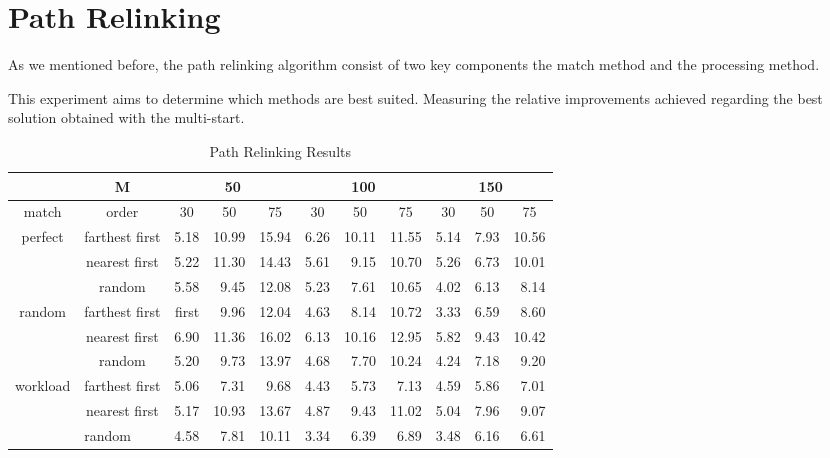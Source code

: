 \section{Path Relinking}
As we mentioned before,
the path relinking algorithm
consist of two key components
the match method and the processing method.

This experiment aims to determine which methods are best suited.
Measuring the relative improvements
achieved regarding the best solution
obtained with the multi-start.

\begin{table}[]
  \centering
  \label{tab:pr}
  \begin{tabular}{c|c|rrr|rrr|rrr|}
    \cline{2-11}
    \multicolumn{1}{l|}{} & M
    & \multicolumn{3}{c|}{50} 
    & \multicolumn{3}{c|}{100}
    & \multicolumn{3}{c|}{150}
    \\ \hline
    \multicolumn{1}{|c|}{match} & order
    & \multicolumn{1}{c}{30} & \multicolumn{1}{c}{50} & \multicolumn{1}{c|}{75}
    & \multicolumn{1}{c}{30} & \multicolumn{1}{c}{50} & \multicolumn{1}{c|}{75}
    & \multicolumn{1}{c}{30} & \multicolumn{1}{c}{50} & \multicolumn{1}{c|}{75}
    \\ \hline
    \multicolumn{1}{|c|}{\multirow{3}{*}{perfect}}
    & farthest first
    & 5.18       & 10.99      & 15.94
    & 6.26       & 10.11      & 11.55
    & 5.14       & 7.93       & 10.56
    \\
    \multicolumn{1}{|c|}{}
    & nearest first
    & 5.22       & 11.30      & 14.43
    & 5.61       & 9.15       & 10.70
    & 5.26       & 6.73       & 10.01
    \\
    \multicolumn{1}{|c|}{}
    & random
    & 5.58       & 9.45       & 12.08
    & 5.23       & 7.61       & 10.65
    & 4.02       & 6.13       & 8.14
    \\ \hline
    \multicolumn{1}{|c|}{\multirow{3}{*}{random}}
    & farthest first
    & first      & 9.96       & 12.04
    & 4.63       & 8.14       & 10.72
    & 3.33       & 6.59       & 8.60
    \\
    \multicolumn{1}{|c|}{}
    & nearest first
    & 6.90       & 11.36      & 16.02
    & 6.13       & 10.16      & 12.95
    & 5.82       & 9.43       & 10.42
    \\
    \multicolumn{1}{|c|}{}
    & random
    & 5.20       & 9.73       & 13.97
    & 4.68       & 7.70       & 10.24
    & 4.24       & 7.18       & 9.20
    \\ \hline
    \multicolumn{1}{|c|}{\multirow{3}{*}{workload}}
    & farthest first
    & 5.06       & 7.31       & 9.68
    & 4.43       & 5.73       & 7.13
    & 4.59       & 5.86       & 7.01
    \\
    \multicolumn{1}{|c|}{}
    & nearest first
    & 5.17       & 10.93      & 13.67
    & 4.87       & 9.43       & 11.02
    & 5.04       & 7.96       & 9.07
    \\
    \multicolumn{1}{|c|}{}
    & \multicolumn{1}{l|}{random}
    & 4.58       & 7.81       & 10.11
    & 3.34       & 6.39       & 6.89
    & 3.48       & 6.16       & 6.61
    \\ \hline
  \end{tabular}
  \caption{Path Relinking Results}
\end{table}
